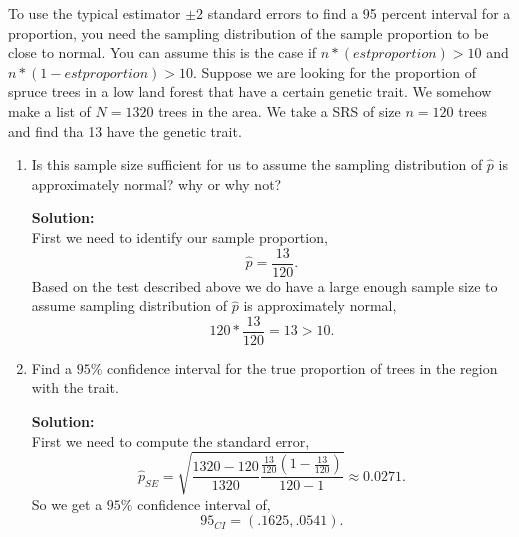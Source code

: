 \documentclass[12pt]{article}
\makeatletter
\theoremstyle{homework}
\newenvironment{exercise}[1]
{\def\@currentlabel{#1}\exercisecore}
{\endexercisecore}
\newcommand{\localhead}[1]{\par\smallskip\noindent\textbf{#1}\nobreak\\}%
\newcommand\solution{\localhead{Solution:}}
\makeatother
\begin{document}
\begin{exercise}{6} To use the typical estimator $\pm 2$ standard errors to find a 95 percent interval 
    for a proportion, you need the sampling distribution of the sample proportion to be close to normal. You can assume 
    this is the case if $n*(est proportion)> 10$ and $n*(1 - est proportion)> 10$. Suppose we are looking for the proportion of 
    spruce trees in a low land forest that have a certain genetic trait. We somehow make a list of $N=1320$ trees in the area. 
    We take a SRS of size $n = 120$ trees and find tha 13 have the genetic trait. \\
    \begin{enumerate}
        \item Is this sample size sufficient for us to assume the sampling distribution of $\hat{p}$ is approximately normal?
        why or why not?\\
        \solution First we need to identify our sample proportion, 
        \begin{equation*}
            \hat{p} = \dfrac{13}{120}.
        \end{equation*}
        Based on the test described above we do have a large enough sample size to assume sampling distribution of $\hat{p}$ is approximately normal,
        \begin{equation*}
            120*\dfrac{13}{120} = 13 > 10.
        \end{equation*}
        \vspace{.15in}

        \item Find a $95\%$ confidence interval for the true proportion of trees in the region with the trait.\\
        \solution First we need to compute the standard error, 
        \begin{equation*}
            \hat{p}_{SE} = \sqrt{\dfrac{1320 - 120}{1320}\dfrac{\frac{13}{120}(1 - \frac{13}{120})}{120-1}} \approx 0.0271.
        \end{equation*}
        So we get a $95\%$ confidence interval of,
        \begin{equation*}
            95_{CI} = (.1625, .0541).
        \end{equation*}
    \end{enumerate}    
\end{exercise}
\vspace{.25in}
\end{document}
